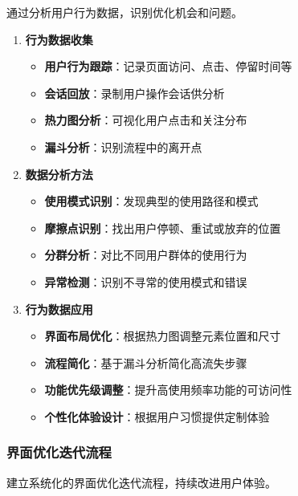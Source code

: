通过分析用户行为数据，识别优化机会和问题。

\begin{enumerate}
\def\labelenumi{\arabic{enumi}.}
\tightlist
\item
  \textbf{行为数据收集}

  \begin{itemize}
  \tightlist
  \item
    \textbf{用户行为跟踪}：记录页面访问、点击、停留时间等
  \item
    \textbf{会话回放}：录制用户操作会话供分析
  \item
    \textbf{热力图分析}：可视化用户点击和关注分布
  \item
    \textbf{漏斗分析}：识别流程中的离开点
  \end{itemize}
\item
  \textbf{数据分析方法}

  \begin{itemize}
  \tightlist
  \item
    \textbf{使用模式识别}：发现典型的使用路径和模式
  \item
    \textbf{摩擦点识别}：找出用户停顿、重试或放弃的位置
  \item
    \textbf{分群分析}：对比不同用户群体的使用行为
  \item
    \textbf{异常检测}：识别不寻常的使用模式和错误
  \end{itemize}
\item
  \textbf{行为数据应用}

  \begin{itemize}
  \tightlist
  \item
    \textbf{界面布局优化}：根据热力图调整元素位置和尺寸
  \item
    \textbf{流程简化}：基于漏斗分析简化高流失步骤
  \item
    \textbf{功能优先级调整}：提升高使用频率功能的可访问性
  \item
    \textbf{个性化体验设计}：根据用户习惯提供定制体验
  \end{itemize}
\end{enumerate}

\subsubsection{界面优化迭代流程}\label{ux754cux9762ux4f18ux5316ux8fedux4ee3ux6d41ux7a0b}

建立系统化的界面优化迭代流程，持续改进用户体验。

